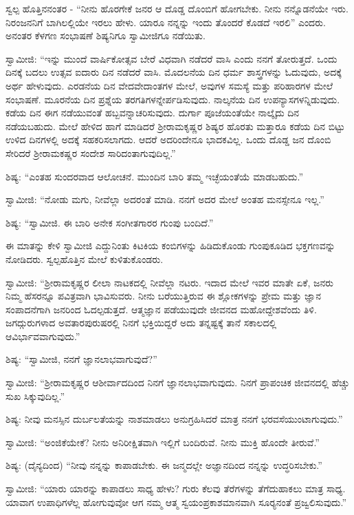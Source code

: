  ಸ್ವಲ್ಪ ಹೊತ್ತಿನನಂತರ - “ನೀನು ಹೊರಗೇಕೆ ಜನರ ಆ ದೊಡ್ಡ ದೊಂಬಿಗೆ ಹೋಗಬೇಕು. ನೀನು ನನ್ನೊಡನೆಯೇ ಇರು. ನಿರಂಜನನಿಗೆ ಬಾಗಿಲಲ್ಲಿಯೇ ಇರಲು ಹೇಳು. ಯಾರೂ ನನ್ನನ್ನು ಇಂದು ತೊಂದರೆ ಕೊಡದೆ ಇರಲಿ” ಎಂದರು. ಅನಂತರ ಕೆಳಗಣ ಸಂಭಾಷಣೆ ಶಿಷ್ಯನಿಗೂ ಸ್ವಾಮೀಜಿಗೂ ನಡೆಯಿತು. 

 ಸ್ವಾಮೀಜಿ: “ಇನ್ನು ಮುಂದೆ ವಾರ್ಷಿಕೋತ್ಸವ ಬೇರೆ ವಿಧವಾಗಿ ನಡೆದರೆ ವಾಸಿ ಎಂದು ನನಗೆ ತೋರುತ್ತದೆ. ಒಂದು ದಿನಕ್ಕೆ ಬದಲು ಉತ್ಸವ ಐದಾರು ದಿನ ನಡೆದರೆ ವಾಸಿ. ಮೊದಲನೆಯ ದಿನ ಧರ್ಮ ಶಾಸ್ತ್ರಗಳನ್ನು ಓದುವುದು, ಅದಕ್ಕೆ ಅರ್ಥ ಹೇಳುವುದು. ಎರಡನೆಯ ದಿನ ವೇದವೇದಾಂತಗಳ ಮೇಲೆ, ಅವುಗಳ ಸಮಸ್ಯೆ ಮತ್ತು ಪರಿಹಾರಗಳ ಮೇಲೆ ಸಂಭಾಷಣೆ. ಮೂರನೆಯ ದಿನ ಪ್ರಶ್ನೆಯ ತರಗತಿಗಳನ್ನೇರ್ಪಡಿಸುವುದು. ನಾಲ್ಕನೆಯ ದಿನ ಉಪನ್ಯಾಸಗಳನ್ನಿಡುವುದು. ಕಡೆಯ ದಿನ ಈಗ ನಡೆಯುವಂತೆ ಹಬ್ಬವನ್ನಾಚರಿಸುವುದು. ದುರ್ಗಾ ಪೂಜೆಯಂತೆಯೇ ನಾಲ್ಕೈದು ದಿನ ನಡೆಯಬಹುದು. ಮೇಲೆ ಹೇಳಿದ ಹಾಗೆ ಮಾಡಿದರೆ ಶ‍್ರೀರಾಮಕೃಷ್ಣರ ಶಿಷ್ಯರ ಹೊರತು ಮತ್ತಾರೂ ಕಡೆಯ ದಿನ ಬಿಟ್ಟು ಉಳಿದ ದಿನಗಳಲ್ಲಿ ಅದಕ್ಕೆ ಸಹಕರಿಸಲಾಗದು. ಆದರೆ ಅದರಿಂದೇನೂ ಭಾದಕವಿಲ್ಲ. ಒಂದು ದೊಡ್ಡ ಜನ ದೊಂಬಿ ಸೇರಿದರೆ ಶ‍್ರೀರಾಮಕಷ್ಣರ ಸಂದೇಶ ಸಾರಿದಂತಾಗುವುದಿಲ್ಲ.” 

 ಶಿಷ್ಯ: “ಎಂತಹ ಸುಂದರವಾದ ಆಲೋಚನೆ. ಮುಂದಿನ ಬಾರಿ ತಮ್ಮ ಇಚ್ಛೆಯಂತೆಯೆ ಮಾಡಬಹುದು.” 

 ಸ್ವಾಮೀಜಿ: “ನೋಡು ಮಗು, ನೀವೆಲ್ಲಾ ಅದರಂತೆ ಮಾಡಿ. ನನಗೆ ಅದರ ಮೇಲೆ ಅಂತಹ ಮನಸ್ಸೇನೂ ಇಲ್ಲ.” 

 ಶಿಷ್ಯ: “ಸ್ವಾಮೀಜಿ. ಈ ಬಾರಿ ಅನೇಕ ಸಂಗೀತಗಾರರ ಗುಂಪು ಬಂದಿದೆ.” 

 ಈ ಮಾತನ್ನು ಕೇಳಿ ಸ್ವಾಮೀಜಿ ಎದ್ದುನಿಂತು ಕಿಟಕಿಯ ಕಂಬಿಗಳನ್ನು ಹಿಡಿದುಕೊಂಡು ಗುಂಪುಕೂಡಿದ ಭಕ್ತಗಣವನ್ನು ನೋಡಿದರು. ಸ್ವಲ್ಪಹೊತ್ತಿನ ಮೇಲೆ ಕುಳಿತುಕೊಂಡರು. 

 ಸ್ವಾಮೀಜಿ: “ಶ‍್ರೀರಾಮಕೃಷ್ಣರ ಲೀಲಾ ನಾಟಕದಲ್ಲಿ ನೀವೆಲ್ಲಾ ನಟರು. ಇದಾದ ಮೇಲೆ ಇವರ ಮಾತೇ ಏಕೆ, ಜನರು ನಿಮ್ಮ ಹೆಸರನ್ನೂ ಪವಿತ್ರವಾಗಿ ಭಾವಿಸುವರು. ನೀನು ಬರೆಯುತ್ತಿರುವ ಈ ಶ್ಲೋಕಗಳನ್ನು ಪ್ರೇಮ ಮತ್ತು ಜ್ಞಾನ ಸಂಪಾದನೆಗಾಗಿ ಜನರಿಂದ ಓದಲ್ಪಡುತ್ತದೆ. ಆತ್ಮಜ್ಞಾನ ಪಡೆಯುವುದೇ ಜೀವನದ ಮಹೋದ್ದೇಶವೆಂದು ತಿಳಿ. ಜಗದ್ಗುರುಗಳಾದ ಅವತಾರಪುರುಷರಲ್ಲಿ ನಿನಗೆ ಭಕ್ತಿಯಿದ್ದರೆ ಅದು ತನ್ನಷ್ಟಕ್ಕೆ ತಾನೆ ಸಕಾಲದಲ್ಲಿ ಆವಿರ್ಭಾವವಾಗುವುದು.” 

 ಶಿಷ್ಯ: “ಸ್ವಾಮೀಜಿ, ನನಗೆ ಜ್ಞಾನಲಾಭವಾಗುವುದೆ?” 

 ಸ್ವಾಮೀಜಿ: “ಶ‍್ರೀರಾಮಕೃಷ್ಣರ ಆಶೀರ್ವಾದದಿಂದ ನಿನಗೆ ಜ್ಞಾನಲಾಭವಾಗುವುದು. ನಿನಗೆ ಪ್ರಾಪಂಚಿಕ ಜೀವನದಲ್ಲಿ ಹೆಚ್ಚು ಸುಖ ಸಿಕ್ಕುವುದಿಲ್ಲ.” 

 ಶಿಷ್ಯ: ನೀವು ಮನಸ್ಸಿನ ದುರ್ಬಲತೆಯನ್ನು ನಾಶಮಾಡಲು ಅನುಗ್ರಹಿಸಿದರೆ ಮಾತ್ರ ನನಗೆ ಭರವಸೆಯುಂಟಾಗುವುದು.” 

 ಸ್ವಾಮೀಜಿ: “ಅಂಜಿಕೆಯೇಕೆ? ನೀನು ಅನಿರೀಕ್ಷಿತವಾಗಿ ಇಲ್ಲಿಗೆ ಬಂದಿರುವೆ. ನೀನು ಮುಕ್ತಿ ಹೊಂದೇ ತೀರುವೆ.” 

 ಶಿಷ್ಯ: (ದೈನ್ಯದಿಂದ) “ನೀವು ನನ್ನನ್ನು ಕಾಪಾಡಬೇಕು. ಈ ಜನ್ಮದಲ್ಲೇ ಅಜ್ಞಾನದಿಂದ ನನ್ನನ್ನು ಉದ್ಧರಿಸಬೇಕು.” 

 ಸ್ವಾಮೀಜಿ: “ಯಾರು ಯಾರನ್ನು ಕಾಪಾಡಲು ಸಾಧ್ಯ ಹೇಳು? ಗುರು ಕೆಲವು ತೆರೆಗಳನ್ನು ತೆಗೆದುಹಾಕಲು ಮಾತ್ರ ಸಾಧ್ಯ. ಯಾವಾಗ ಉಪಾಧಿಗಳೆಲ್ಲ ಹೋಗುವುವೋ ಆಗ ನಮ್ಮ ಆತ್ಮ ಸ್ವಯಂಪ್ರಕಾಶಮಾನವಾಗಿ ಸೂರ‍್ಯನಂತೆ ಪ್ರಜ್ವಲಿಸುವುದು.” 

